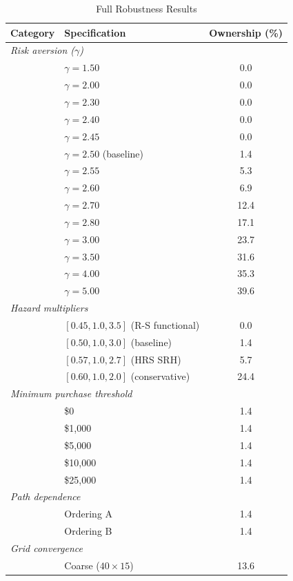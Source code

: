 \documentclass[12pt]{article}
\begin{document}
\begin{table}[htbp]
\centering
\caption{Full Robustness Results}
\label{tab:full_robustness}
\begin{threeparttable}
\begin{tabular}{llc}
\toprule
Category & Specification & Ownership (\%) \\
\midrule
\multicolumn{3}{l}{\textit{Risk aversion ($\gamma$)}} \\
 & $\gamma = 1.50$ & 0.0 \\
 & $\gamma = 2.00$ & 0.0 \\
 & $\gamma = 2.30$ & 0.0 \\
 & $\gamma = 2.40$ & 0.0 \\
 & $\gamma = 2.45$ & 0.0 \\
 & $\gamma = 2.50$ (baseline) & 1.4 \\
 & $\gamma = 2.55$ & 5.3 \\
 & $\gamma = 2.60$ & 6.9 \\
 & $\gamma = 2.70$ & 12.4 \\
 & $\gamma = 2.80$ & 17.1 \\
 & $\gamma = 3.00$ & 23.7 \\
 & $\gamma = 3.50$ & 31.6 \\
 & $\gamma = 4.00$ & 35.3 \\
 & $\gamma = 5.00$ & 39.6 \\[4pt]
\multicolumn{3}{l}{\textit{Hazard multipliers}} \\
 & $[0.45, 1.0, 3.5]$ (R-S functional) & 0.0 \\
 & $[0.50, 1.0, 3.0]$ (baseline) & 1.4 \\
 & $[0.57, 1.0, 2.7]$ (HRS SRH) & 5.7 \\
 & $[0.60, 1.0, 2.0]$ (conservative) & 24.4 \\[4pt]
\multicolumn{3}{l}{\textit{Minimum purchase threshold}} \\
 & \$0 & 1.4 \\
 & \$1,000 & 1.4 \\
 & \$5,000 & 1.4 \\
 & \$10,000 & 1.4 \\
 & \$25,000 & 1.4 \\[4pt]
\multicolumn{3}{l}{\textit{Path dependence}} \\
 & Ordering A & 1.4 \\
 & Ordering B & 1.4 \\[4pt]
\multicolumn{3}{l}{\textit{Grid convergence}} \\
 & Coarse ($40 \times 15$) & 13.6 \\

\end{tabular}
\end{threeparttable}
\end{table}
\end{document}
